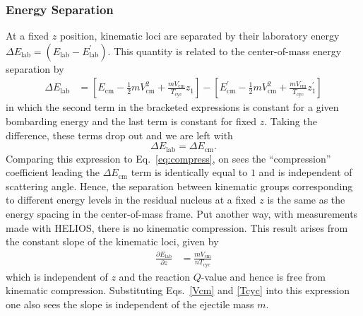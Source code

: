 \subsubsection{Energy Separation}
\label{energysep}
At a fixed $z$ position, kinematic loci are separated %
 by their laboratory energy $\Delta E_\mathrm{lab}=(E_\mathrm{lab}-E_\mathrm{lab}^\prime)$.  This quantity is related to the center-of-mass energy separation by
\begin{equation}
\begin{split}
\Delta E_\mathrm{lab}%
&=\left[E_\mathrm{cm}-\frac{1}{2} mV_\mathrm{cm}^2+\frac{m V_\mathrm{cm}}{T_\mathrm{cyc}}z_1\right]-\left[E_\mathrm{cm}^\prime-\frac{1}{2} mV_\mathrm{cm}^2+\frac{m V_\mathrm{cm}}{T_\mathrm{cyc}}z_1^\prime\right]%
\end{split}
\label{eq:delta_e}
\end{equation}
in which the second term in the bracketed expressions is constant for a given bombarding energy and the last term is constant for fixed $z$.  Taking the difference, these terms drop out and we are left with
\begin{equation}
\Delta E_\mathrm{lab}=\Delta E_\mathrm{cm}.
\label{eq:no_comp}
\end{equation}
Comparing this expression to Eq.~\ref{eq:compress}, on sees the ``compression'' coefficient leading the $\Delta E_\mathrm{cm}$ term is identically equal to $1$ and is independent of scattering angle.  Hence, the separation between kinematic groups corresponding to different energy levels in the residual nucleus at a fixed $z$ is the same as the energy spacing in the center-of-mass frame.  Put another way, with measurements made with HELIOS, there is no kinematic compression. 
This result arises from the constant slope of the kinematic loci, given by
\begin{equation}
\begin{split}
\frac{\partial E_\mathrm{lab}}{\partial z}&=\frac{m V_\mathrm{cm}}{nT_\mathrm{cyc}}
\end{split}
\label{slopeEcm}
\end{equation}
which is independent of $z$ and the reaction $Q$-value and hence is free from kinematic compression. Substituting Eqs.~\ref{Vcm} and \ref{Tcyc} into this expression one also sees the slope is independent of the ejectile mass $m$.

